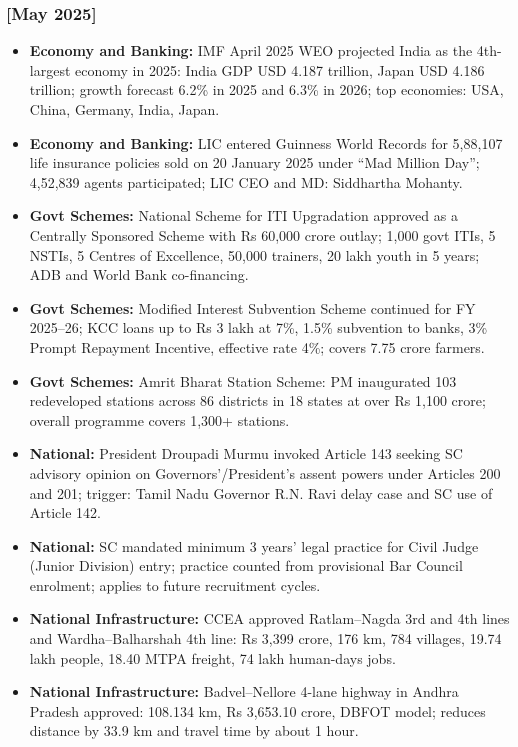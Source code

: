 \documentclass[10pt,a4paper]{article}
\newcommand{\monthtag}[1]{\textbf{[#1]}}
\begin{document}
\subsubsection{\monthtag{May 2025}}
\begin{itemize}
    \item \textbf{Economy and Banking:} IMF April 2025 WEO projected India as the 4th-largest economy in 2025: India GDP USD 4.187 trillion, Japan USD 4.186 trillion; growth forecast 6.2\% in 2025 and 6.3\% in 2026; top economies: USA, China, Germany, India, Japan.
    \item \textbf{Economy and Banking:} LIC entered Guinness World Records for 5,88,107 life insurance policies sold on 20 January 2025 under ``Mad Million Day''; 4,52,839 agents participated; LIC CEO and MD: Siddhartha Mohanty.
    \item \textbf{Govt Schemes:} National Scheme for ITI Upgradation approved as a Centrally Sponsored Scheme with Rs 60,000 crore outlay; 1,000 govt ITIs, 5 NSTIs, 5 Centres of Excellence, 50,000 trainers, 20 lakh youth in 5 years; ADB and World Bank co-financing.
    \item \textbf{Govt Schemes:} Modified Interest Subvention Scheme continued for FY 2025--26; KCC loans up to Rs 3 lakh at 7\%, 1.5\% subvention to banks, 3\% Prompt Repayment Incentive, effective rate 4\%; covers 7.75 crore farmers.
    \item \textbf{Govt Schemes:} Amrit Bharat Station Scheme: PM inaugurated 103 redeveloped stations across 86 districts in 18 states at over Rs 1,100 crore; overall programme covers 1,300+ stations.
    \item \textbf{National:} President Droupadi Murmu invoked Article 143 seeking SC advisory opinion on Governors'/President's assent powers under Articles 200 and 201; trigger: Tamil Nadu Governor R.N. Ravi delay case and SC use of Article 142.
    \item \textbf{National:} SC mandated minimum 3 years' legal practice for Civil Judge (Junior Division) entry; practice counted from provisional Bar Council enrolment; applies to future recruitment cycles.
    \item \textbf{National Infrastructure:} CCEA approved Ratlam--Nagda 3rd and 4th lines and Wardha--Balharshah 4th line: Rs 3,399 crore, 176 km, 784 villages, 19.74 lakh people, 18.40 MTPA freight, 74 lakh human-days jobs.
    \item \textbf{National Infrastructure:} Badvel--Nellore 4-lane highway in Andhra Pradesh approved: 108.134 km, Rs 3,653.10 crore, DBFOT model; reduces distance by 33.9 km and travel time by about 1 hour.

\end{itemize}
\end{document}
